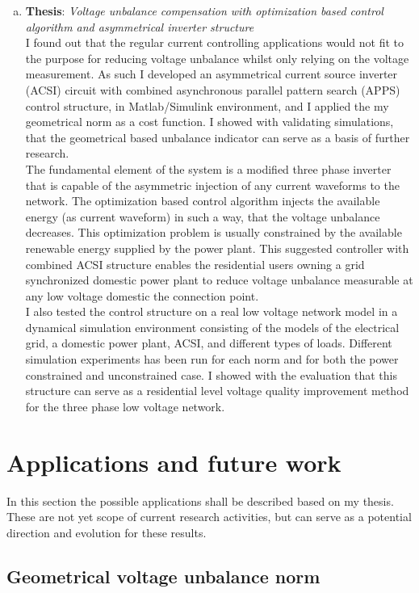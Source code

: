 \begin{enumerate}[a.)]
\item\textbf{Thesis}: \emph{Voltage unbalance compensation with optimization based control algorithm and asymmetrical inverter structure}\\
     I found out that the regular current controlling applications would not fit to the purpose for reducing voltage unbalance whilst only relying on the voltage measurement. As such I developed an asymmetrical current source inverter (ACSI) circuit with combined asynchronous parallel pattern search (APPS) control structure, in Matlab/Simulink environment, and I applied the my geometrical norm as a cost function. I showed with validating simulations, that the geometrical based unbalance indicator can serve as a basis of further research. \\
		The fundamental element of the system is a modified three phase inverter that is capable of the asymmetric injection of any current waveforms to the network. The optimization based control algorithm injects the available energy (as current waveform) in such a way, that the voltage unbalance decreases. This optimization problem is usually constrained by the available renewable energy supplied by the power plant. This suggested controller with combined ACSI structure enables the residential users owning a grid synchronized domestic power plant to reduce voltage unbalance measurable at any low voltage domestic the connection point.\\
    I also tested the control structure on a real low voltage network model in a dynamical simulation environment consisting of the models of the electrical grid, a domestic power plant, ACSI, and different types of loads. Different simulation experiments has been run for each norm and for both the power constrained and unconstrained case. I showed with the evaluation that this structure can serve as a residential level voltage quality improvement method for the three phase low voltage network.\\
\end{enumerate}
		\section{Applications and future work}
		
		In this section the possible applications shall be described based on my thesis. These are not yet scope of current research activities, but can serve as a potential direction and evolution for these results.
		
		\subsection{Geometrical voltage unbalance norm}
		
